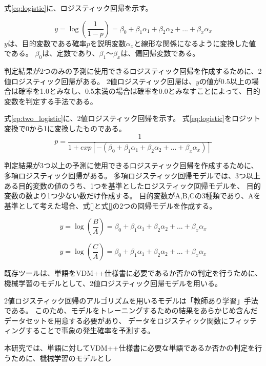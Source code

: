 式\ref{eq:logistic}に、ロジスティック回帰を示す。

\begin{equation}\label{eq:logistic}
    y = \log{(\frac{1}{1-p})}= \beta_{0}+ \beta_{1}\alpha_{1}+\beta_{2}\alpha_{2}+...+\beta_{x}\alpha_{x}
\end{equation}
$y$は、目的変数である確率$p$を説明変数$\alpha_{x}$と線形な関係になるように変換した値である。
$\beta_{0}$は、定数であり、$\beta_{1}～\beta_{x}$は、偏回帰変数である。

判定結果が2つのみの予測に使用できるロジスティック回帰を作成するために、2値ロジスティック回帰がある\cite{two_logistic}。
2値ロジスティック回帰は、$y$の値が0.5以上の場合は確率を1.0とみなし、0.5未満の場合は確率を0.0とみなすことによって、目的変数を判定する手法である。

式\ref{ep:two_logistic}に、2値ロジスティック回帰を示す。
式\ref{eq:logistic}をロジット変換で0から1に変換したものである。
\begin{equation}\label{eq:two_logistic}
    p = \frac{1}{1+exp[- (\beta_{0}+ \beta_{1}\alpha_{1}+\beta_{2}\alpha_{2}+...+\beta_{x}\alpha_{x})]}
\end{equation}

判定結果が3つ以上の予測に使用できるロジスティック回帰を作成するために、多項ロジスティック回帰がある\cite{multinomial_logistic}。
多項ロジスティック回帰モデルでは、3つ以上ある目的変数の値のうち、1つを基準としたロジスティック回帰モデルを、
目的変数の数より1つ少ない数だけ作成する。
目的変数がA,B,Cの3種類であり、Aを基準として考えた場合、式\ref{}と式\ref{}の2つの回帰モデルを作成する。

\begin{equation}\label{eq:logistic}
    y = \log{(\frac{B}{A})}= \beta_{0}+ \beta_{1}\alpha_{1}+\beta_{2}\alpha_{2}+...+\beta_{x}\alpha_{x}
\end{equation}

\begin{equation}\label{eq:logistic}
    y = \log{(\frac{C}{A})}= \beta_{0}+ \beta_{1}\alpha_{1}+\beta_{2}\alpha_{2}+...+\beta_{x}\alpha_{x}
\end{equation}



既存ツールは、単語をVDM++仕様書に必要であるか否かの判定を行うために、機械学習のモデルとして、2値ロジスティック回帰モデルを用いる。
   
2値ロジスティック回帰のアルゴリズムを用いるモデルは「教師あり学習」手法である。
このため、モデルをトレーニングするための結果をあらかじめ含んだデータセットを用意する必要があり、
データをロジスティック関数にフィッティングすることで事象の発生確率を予測する。

本研究では、単語に対してVDM++仕様書に必要な単語であるか否かの判定を行うために、機械学習のモデルとし